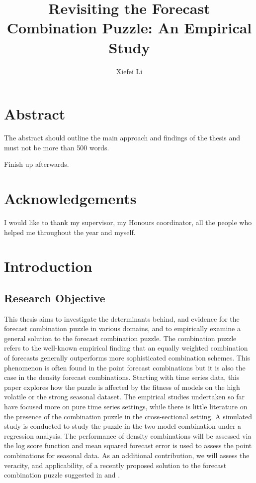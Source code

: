 \documentclass{monashthesis}
\author{Xiefei Li}
\title{Revisiting the Forecast Combination Puzzle: An Empirical Study}
\begin{document}

\titlepage

{\sf\tighttoc\doublespacing}

\clearpage{}\setcounter{page}{1}

\hypertarget{abstract}{%
\chapter*{Abstract}\label{abstract}}

The abstract should outline the main approach and findings of the thesis and must not be more than 500 words.

Finish up afterwards.

\newpage

\hypertarget{acknowledgements}{%
\chapter*{Acknowledgements}\label{acknowledgements}}

I would like to thank my supervisor, my Honours coordinator, all the people who helped me throughout the year and myself.

\hypertarget{introduction}{%
\chapter{Introduction}\label{introduction}}

\hypertarget{research-objective}{%
\section{Research Objective}\label{research-objective}}

This thesis aims to investigate the determinants behind, and evidence for the forecast combination puzzle in various domains, and to empirically examine a general solution to the forecast combination puzzle. The combination puzzle refers to the well-known empirical finding that an equally weighted combination of forecasts generally outperforms more sophisticated combination schemes. This phenomenon is often found in the point forecast combinations but it is also the case in the density forecast combinations. Starting with time series data, this paper explores how the puzzle is affected by the fitness of models on the high volatile or the strong seasonal dataset. The empirical studies undertaken so far have focused more on pure time series settings, while there is little literature on the presence of the combination puzzle in the cross-sectional setting. A simulated study is conducted to study the puzzle in the two-model combination under a regression analysis. The performance of density combinations will be assessed via the log score function and mean squared forecast error is used to assess the point combinations for seasonal data. As an additional contribution, we will assess the veracity, and applicability, of a recently proposed solution to the forecast combination puzzle suggested in \textcite{ZMFP22} and \textcite{FZMP23}.
\end{document}
